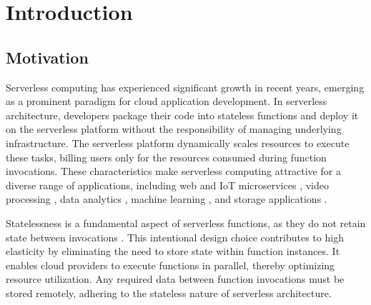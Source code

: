 

\chapter[Introduction]{Introduction}

\section{Motivation}

Serverless computing has experienced significant growth in recent years, emerging as a prominent paradigm for cloud application development. In serverless architecture, developers package their code into stateless functions and deploy it on the serverless platform without the responsibility of managing underlying infrastructure. The serverless platform dynamically scales resources to execute these tasks, billing users only for the resources consumed during function invocations. These characteristics make serverless computing attractive for a diverse range of applications, including web and IoT microservices \cite{gan2019opensource}, video processing \cite{fouladi2017encoding}, data analytics \cite{gimenez2019framework,carver2020wukong,klimovic2018pocket}, machine learning \cite{carreira2019cirrus,feng2018exploring}, and storage applications \cite{10.14778/3587136.3587139,jonas2019cloud}.

Statelessness is a fundamental aspect of serverless functions, as they do not retain state between invocations \cite{jonas2019cloud}. This intentional design choice contributes to high elasticity by eliminating the need to store state within function instances. It enables cloud providers to execute functions in parallel, thereby optimizing resource utilization. Any required data between function invocations must be stored remotely, adhering to the stateless nature of serverless architecture.

